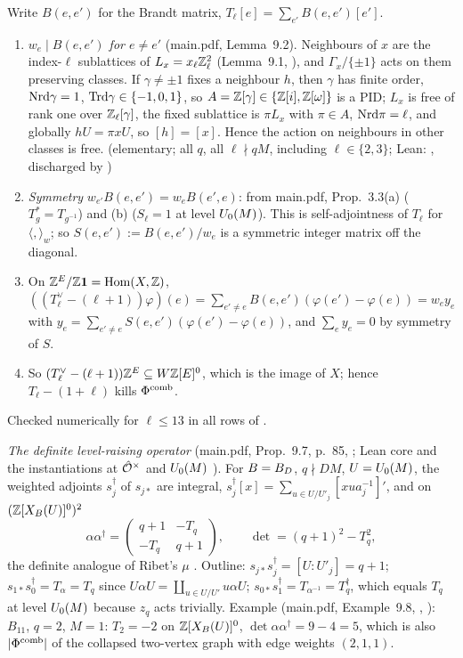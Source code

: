 \begin{outline}
Write $B(e,e')$ for the Brandt matrix, $T_\ell[e]=\sum_{e'}B(e,e')[e']$.
\begin{enumerate}[label=(\arabic*)]
\item \emph{$w_e\mid B(e,e')$ for $e\ne e'$} (main.pdf, Lemma~9.2). Neighbours of $x$ are the index-$\ell$ sublattices of $L_x=x_\ell\mathbb{Z}_\ell^2$
  (Lemma~9.1, \stproved), and $\Gamma_x/\{\pm1\}$ acts on them preserving classes. If $\gamma\ne\pm1$ fixes a neighbour $h$, then
  $\gamma$ has finite order, $\mathrm{Nrd}\gamma=1$, $\mathrm{Trd}\gamma\in\{-1,0,1\}$, so $A=\mathbb{Z}[\gamma]\in\{\mathbb{Z}[i],\mathbb{Z}[\omega]\}$ is a PID; $L_x$ is free of rank one over
  $\mathbb{Z}_\ell[\gamma]$, the fixed sublattice is $\pi L_x$ with $\pi\in A$, $\mathrm{Nrd}\pi=\ell$, and globally $hU=\pi xU$, so $[h]=[x]$. Hence the action on
  neighbours in other classes is free. \stproved{} (elementary; all $q$, all $\ell\nmid qM$, including $\ell\in\{2,3\}$; Lean: , discharged by \BSFdischargeName)
\item \emph{Symmetry} $w_{e'}B(e,e')=w_eB(e',e)$: from main.pdf, Prop.~3.3(a) ($T_g^*=T_{g^{-1}}$) and (b) ($S_\ell=1$ at level $U_0(M)$). This is self-adjointness of
  $T_\ell$ for $\langle,\rangle_w$; so $S(e,e'):=B(e,e')/w_e$ is a symmetric integer matrix off the diagonal. \stproved
\item On $\mathbb{Z}^E/\mathbb{Z}\mathbf1=\operatorname{Hom}(X,\mathbb{Z})$, $((T_\ell^\vee-(\ell+1))\varphi)(e)=\sum_{e'\ne e}B(e,e')(\varphi(e')-\varphi(e))=w_ey_e$ with
  $y_e=\sum_{e'\ne e}S(e,e')(\varphi(e')-\varphi(e))$, and $\sum_ey_e=0$ by symmetry of $S$. \stproved
\item So $(T_\ell^\vee-(\ell+1))\mathbb{Z}^E\subseteq W\mathbb{Z}[E]^0$, which is the image of $X$; hence $T_\ell-(1+\ell)$ kills $\Phi^{\mathrm{comb}}$. \stproved
\end{enumerate}
Checked numerically for $\ell\le13$ in all rows of  \stcomp.
\end{outline}

\noindent{}\label{rpt:prop:s03-LRdef}\emph{The definite level-raising operator} (main.pdf, Prop.~9.7, p.~85, \stproved; Lean core and the instantiations at $\hat{\mathcal{O}}^\times$ and
$U_0(M)$ \stformal). For $B=B_D$, $q\nmid DM$, $U=U_0(M)$, the weighted adjoints $s_j^\dagger$ of $s_{j*}$ are integral,
$s_j^\dagger[x]=\sum_{u\in U/U'_j}[xua_j^{-1}]'$, and on $(\mathbb{Z}[X_B(U)]^0)^2$
\[\alpha\alpha^\dagger=\begin{pmatrix}q+1&-T_q\\-T_q&q+1\end{pmatrix},\qquad \det=(q+1)^2-T_q^2,\]
the definite analogue of Ribet's $\mu$ \cite[pp.~454--455]{Ri90}. Outline: $s_{j*}s_j^\dagger=[U:U'_j]=q+1$; $s_{1*}s_0^\dagger=T_\alpha=T_q$ since
$U\alpha U=\coprod_{u\in U/U'}u\alpha U$; $s_{0*}s_1^\dagger=T_{\alpha^{-1}}=T_q^\dagger$, which equals $T_q$ at level $U_0(M)$ because $z_q$ acts trivially.
Example (main.pdf, Example~9.8, \stcomp, ): $B_{11}$, $q=2$, $M=1$: $T_2=-2$ on $\mathbb{Z}[X_B(U)]^0$, $\det\alpha\alpha^\dagger=9-4=5$,
which is also $|\Phi^{\mathrm{comb}}|$ of the collapsed two-vertex graph with edge weights $(2,1,1)$.

